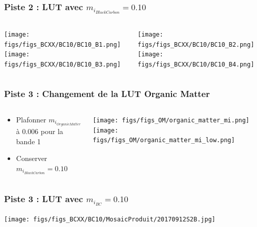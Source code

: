 \documentclass[8pt]{beamer}
\begin{document}
\begin{frame}
\frametitle{Piste 2 : LUT avec $m_{i_{Black Carbon}} = 0.10$}
	\begin{columns}
		\begin{column}{0.5\textwidth}
			\begin{center}
	     		\texttt{[image: figs/figs\_BCXX/BC10/BC10\_B1.png]}	
		     	\texttt{[image: figs/figs\_BCXX/BC10/BC10\_B3.png]}
		    \end{center}		
		    
		\end{column}
		\begin{column}{0.5\textwidth}
			\begin{center}
		     	\texttt{[image: figs/figs\_BCXX/BC10/BC10\_B2.png]}
		     	\texttt{[image: figs/figs\_BCXX/BC10/BC10\_B4.png]}
		    \end{center}				
		\end{column}
	\end{columns}
\end{frame}

\begin{frame}
\frametitle{Piste 3 : Changement de la LUT Organic Matter}
	\begin{columns}
		\begin{column}{0.3\textwidth}	
			\begin{itemize}
				\item Plafonner $m_{i_{Organic Matter}}$ à $0.006$ pour la bande 1
				\item Conserver $m_{i_{Black Carbon}}=0.10$
			\end{itemize}
		\end{column}
		\begin{column}{0.7\textwidth}	
		     	\texttt{[image: figs/figs\_OM/organic\_matter\_mi.png]}
		     	\texttt{[image: figs/figs\_OM/organic\_matter\_mi\_low.png]}
		\end{column}
	\end{columns}
\end{frame}

\begin{frame}
\frametitle{Piste 3 : LUT avec $m_{i_{BC}} = 0.10$}
	\begin{center}
     	\texttt{[image: figs/figs\_BCXX/BC10/MosaicProduit/20170912S2B.jpg]}
    \end{center}		
\end{frame}
\end{document}
